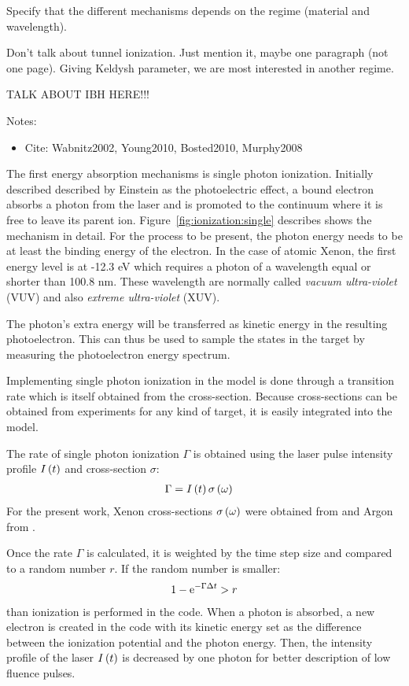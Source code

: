 Specify that the different mechanisms depends on the regime (material and
wavelength).

Don't talk about tunnel ionization. Just mention it, maybe one paragraph (not
one page). Giving Keldysh parameter, we are most interested in another regime.

TALK ABOUT IBH HERE!!!


Notes:
\begin{itemize}
\item Cite: Wabnitz2002, Young2010, Bosted2010, Murphy2008
\end{itemize}

The first energy absorption mechanisms is single photon ionization. Initially
described described by Einstein as the photoelectric effect, a bound electron
absorbs a photon from the laser and is promoted to the continuum where it is
free to leave its parent ion. Figure~\ref{fig:ionization:single} describes
shows the mechanism in detail. For the process to be present, the photon energy
needs to be at least the binding energy of the electron. In the case of
atomic Xenon, the first energy level is at -12.3 eV which requires a photon
of a wavelength equal or shorter than 100.8 nm. These wavelength are normally
called \textit{vacuum ultra-violet} (VUV) and also \textit{extreme
ultra-violet} (XUV).


The photon's extra energy will be transferred as kinetic energy in the
resulting photoelectron. This can thus be used to sample the states in the
target by measuring the photoelectron energy spectrum.

Implementing single photon ionization in the model is done through a
transition rate which is itself obtained from the cross-section. Because
cross-sections can be obtained from experiments for any kind of target, it is
easily integrated into the model.

The rate of single photon ionization $\Gamma$ is obtained using the laser
pulse intensity profile $I\left( t \right)$ and cross-section $\sigma$:
\begin{align}
\Gamma & = I\left( t \right) \sigma\left( \omega \right)
\end{align}
For the present work, Xenon cross-sections $\sigma\left( \omega \right)$ were obtained
from \cite{West1978} and Argon from \cite{Marr1976}.

Once the rate $\Gamma$ is calculated, it is weighted by the time step size and
compared to a random number $r$. If the random number is smaller:
\begin{align}
1 - \textrm{e}^{-\Gamma \Delta t} > r
\end{align}
than ionization is performed in the code. When a photon is absorbed, a new
electron is created in the code with its kinetic energy set as the difference
between the ionization potential and the photon energy. Then, the intensity
profile of the laser $I\left( t \right)$ is decreased by one photon for better
description of low fluence pulses.

